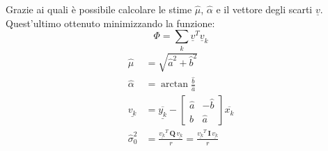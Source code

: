 Grazie ai quali è possibile calcolare le stime $\hat{\mu}$, $\hat{\alpha}$ e il vettore degli scarti $\underline{v}$.
Quest'ultimo ottenuto minimizzando la funzione:
\begin{equation}
	\Phi = \sum_k \underline{v}^T\underline{v}_k
\end{equation}
\begin{align}
	\hat{\mu} &= \sqrt{\hat{a}^2 + \hat{b}^2}\\
	\hat{\alpha} &= \arctan\frac{\hat{b}}{\hat{a}}\\
	\underline{v_k} &= 
	\overline{\underline{y_{k}}}-
	\begin{bmatrix}
		\hat{a} & -\hat{b} \\ 
		\hat{b} & \hat{a}
	\end{bmatrix} 
	\overline{x_{k}} \\
	\hat{\sigma}_0^2 &= \frac{\underline{v_k}^T \,\mathbf{Q} \, \underline{v_k}}{r}=\frac{\underline{v_k}^T \, \mathbf{I} \, \underline{v_k}}{r}
\end{align}
